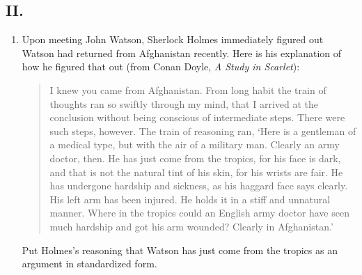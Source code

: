\subsection*{II.}

\begin{enumerate}

\item Upon meeting John Watson, Sherlock Holmes immediately figured out Watson 
 had returned from Afghanistan recently. Here is his explanation of how he 
 figured that out (from Conan Doyle, \emph{A Study in Scarlet}):
 \begin{quote}
   I knew you came from Afghanistan. From long habit the train of thoughts ran 
   so swiftly through my mind, that I arrived at the conclusion without being 
   conscious of intermediate steps. There were such steps, how­ever.  The train 
   of reasoning ran, `Here is a gentleman of a medical type, but with the air of 
   a military man. Clearly an army doc­tor, then. He has just come from the 
   tropics, for his face is dark, and that is not the natural tint of his skin, 
   for his wrists are fair. He has undergone hardship and sickness, as his 
   haggard face says clearly. His left arm has been injured.  He holds it in a 
   stiff and unnatural manner. Where in the tropics could an English army doctor 
  have seen much hard­ship and got his arm wounded?  Clearly in Afghanistan.' 
 \end{quote}

Put Holmes's reasoning that Watson has just come from the tropics as  an 
argument in standardized form.  

\end{enumerate}
